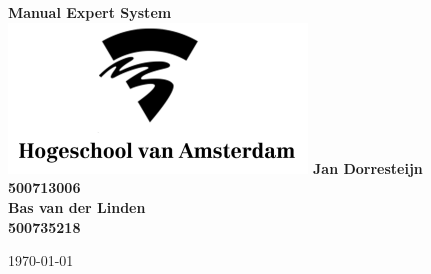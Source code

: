 \begin{titlepage}
  \centering
    \vfill
    {\bfseries\Huge
      Manual Expert System\\
        \vskip2cm
      }
    \includegraphics[height=4cm]{images/hva-logo-png-7.png} %
    \vfill
      {\bfseries\Large
      Jan Dorresteijn  \\
      }
      {
        \bfseries\normalsize
        500713006\\
        \vskip1cm
        }
      {\bfseries\Large
        Bas van der Linden \\
      }
      {
        \bfseries\normalsize
        500735218\\
        \vskip1cm
    }    
    \vfill

    \today\\

\end{titlepage}
\newpage
